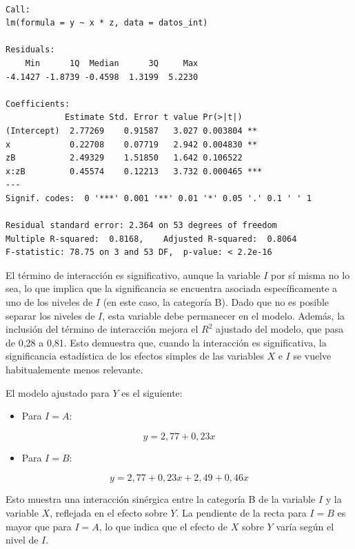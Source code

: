 \documentclass[
  spanish,
  a4paper,
]{scrbook}
\providecommand{\tightlist}{%
  \setlength{\itemsep}{0pt}\setlength{\parskip}{0pt}}
\begin{document}
\begin{verbatim}

Call:
lm(formula = y ~ x * z, data = datos_int)

Residuals:
    Min      1Q  Median      3Q     Max 
-4.1427 -1.8739 -0.4598  1.3199  5.2230 

Coefficients:
            Estimate Std. Error t value Pr(>|t|)    
(Intercept)  2.77269    0.91587   3.027 0.003804 ** 
x            0.22708    0.07719   2.942 0.004830 ** 
zB           2.49329    1.51850   1.642 0.106522    
x:zB         0.45574    0.12213   3.732 0.000465 ***
---
Signif. codes:  0 '***' 0.001 '**' 0.01 '*' 0.05 '.' 0.1 ' ' 1

Residual standard error: 2.364 on 53 degrees of freedom
Multiple R-squared:  0.8168,    Adjusted R-squared:  0.8064 
F-statistic: 78.75 on 3 and 53 DF,  p-value: < 2.2e-16
\end{verbatim}

El término de interacción es significativo, aunque la variable \(I\) por
sí misma no lo sea, lo que implica que la significancia se encuentra
asociada específicamente a uno de los niveles de \(I\) (en este caso, la
categoría B). Dado que no es posible separar los niveles de \(I\), esta
variable debe permanecer en el modelo. Además, la inclusión del término
de interacción mejora el \(R^2\) ajustado del modelo, que pasa de 0,28 a
0,81. Esto demuestra que, cuando la interacción es significativa, la
significancia estadística de los efectos simples de las variables \(X\)
e \(I\) se vuelve habitualemente menos relevante.

El modelo ajustado para \(Y\) es el siguiente:

\begin{itemize}
\tightlist
\item
  Para \(I = A\):
\end{itemize}

\[
y = 2,77 + 0,23 x
\]

\begin{itemize}
\tightlist
\item
  Para \(I = B\):
\end{itemize}

\[
y = 2,77 + 0,23x +2,49 + 0,46x 
\]

Esto muestra una interacción sinérgica entre la categoría B de la
variable \(I\) y la variable \(X\), reflejada en el efecto sobre \(Y\).
La pendiente de la recta para \(I = B\) es mayor que para \(I = A\), lo
que indica que el efecto de \(X\) sobre \(Y\) varía según el nivel de
\(I\).
\end{document}
